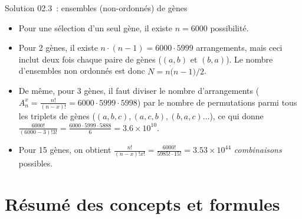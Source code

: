 \documentclass[ignorenonframetext,]{beamer}
\providecommand{\tightlist}{%
  \setlength{\itemsep}{0pt}\setlength{\parskip}{0pt}}
\begin{document}
\begin{frame}{Solution 02.3~: ensembles (non-ordonnés) de gènes}
\protect\hypertarget{solution-02.3-ensembles-non-ordonnes-de-genes}{}

\begin{itemize}
\tightlist
\item
  Pour une sélection d'un seul gène, il existe \(n=6000\) possibilité.
\item
  Pour 2 gènes, il existe \(n \cdot (n-1) = 6000 \cdot 5999\)
  arrangements, mais ceci inclut deux fois chaque paire de gènes
  (\((a, b)\) et \((b, a)\)). Le nombre d'ensembles non ordonnés est
  donc \(N = n \dot (n-1)/2\).
\item
  De même, pour 3 gènes, il faut diviser le nombre d'arrangements
  (\(A^x_n = \frac{n!}{(n-x)!} = 6000 \cdot 5999 \cdot 5998\)) par le
  nombre de permutations parmi tous les triplets de gènes
  (\((a, b, c), (a, c, b), (b, a, c) \ldots\)), ce qui donne
  \(\frac{6000!}{(6000-3)! 3!} = \frac{6000 \cdot 5999 \cdot 5888}{6} = \ensuremath{3.6\times 10^{10}}\).
\item
  Pour 15 gènes, on obtient
  \(\frac{n!}{(n-x)!x!} = \frac{6000!}{5985! \cdot 15!} = \ensuremath{3.53\times 10^{44}}\)
  \emph{combinaisons} possibles.
\end{itemize}

\end{frame}

\hypertarget{resume-des-concepts-et-formules}{%
\section{Résumé des concepts et
formules}\label{resume-des-concepts-et-formules}}
\end{document}
